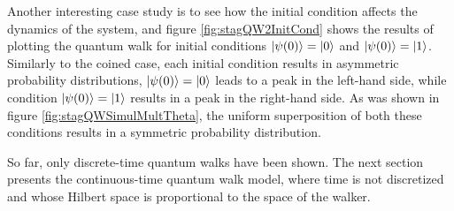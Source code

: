 \documentclass[../../dissertation.tex]{subfiles}
\begin{document}
Another interesting case study is to see how the initial condition affects the
dynamics of the system, and figure \ref{fig:stagQW2InitCond} shows the results
of plotting the quantum walk for initial conditions  $\ket{\psi(0)}=\ket{0}$
and $\ket{\psi(0)}=\ket{1}$.  Similarly to the coined case, each initial
condition results in asymmetric probability distributions,
$\ket{\psi(0)}=\ket{0}$ leads to a peak  in the left-hand side, while condition
$\ket{\psi(0)}=\ket{1}$ results in a peak in the right-hand side. As was shown
in figure \ref{fig:stagQWSimulMultTheta}, the uniform superposition of both
these conditions results in a symmetric probability distribution.\par

So far, only discrete-time quantum walks have been shown. The next section
presents the continuous-time quantum walk model, where time is not discretized
and whose Hilbert space is proportional to the space of the walker.

\end{document}
